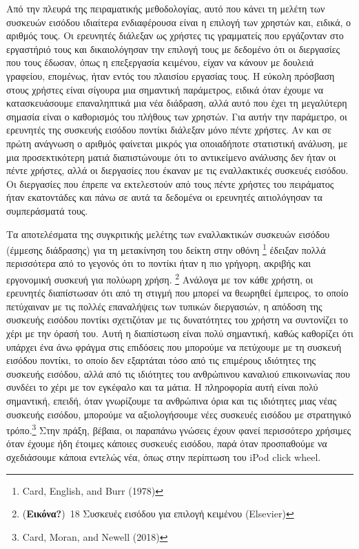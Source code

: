 \documentclass[
]{article}
\begin{document}
Από την πλευρά της πειραματικής μεθοδολογίας, αυτό που κάνει τη μελέτη
των συσκευών εισόδου ιδιαίτερα ενδιαφέρουσα είναι η επιλογή των χρηστών
και, ειδικά, ο αριθμός τους. Οι ερευνητές διάλεξαν ως χρήστες τις
γραμματείς που εργάζονταν στο εργαστήριό τους και δικαιολόγησαν την
επιλογή τους με δεδομένο ότι οι διεργασίες που τους έδωσαν, όπως η
επεξεργασία κειμένου, είχαν να κάνουν με δουλειά γραφείου, επομένως,
ήταν εντός του πλαισίου εργασίας τους. Η εύκολη πρόσβαση στους χρήστες
είναι σίγουρα μια σημαντική παράμετρος, ειδικά όταν έχουμε να
κατασκευάσουμε επαναληπτικά μια νέα διάδραση, αλλά αυτό που έχει τη
μεγαλύτερη σημασία είναι ο καθορισμός του πλήθους των χρηστών. Για αυτήν
την παράμετρο, οι ερευνητές της συσκευής εισόδου ποντίκι διάλεξαν μόνο
πέντε χρήστες. Αν και σε πρώτη ανάγνωση ο αριθμός φαίνεται μικρός για
οποιαδήποτε στατιστική ανάλυση, με μια προσεκτικότερη ματιά
διαπιστώνουμε ότι το αντικείμενο ανάλυσης δεν ήταν οι πέντε χρήστες,
αλλά οι διεργασίες που έκαναν με τις εναλλακτικές συσκευές εισόδου. Οι
διεργασίες που έπρεπε να εκτελεστούν από τους πέντε χρήστες του
πειράματος ήταν εκατοντάδες και πάνω σε αυτά τα δεδομένα οι ερευνητές
αιτιολόγησαν τα συμπεράσματά τους.

Τα αποτελέσματα της συγκριτικής μελέτης των εναλλακτικών συσκευών
εισόδου (έμμεσης διάδρασης) για τη μετακίνηση του δείκτη στην οθόνη
\footnote{Card, English, and Burr (1978)} έδειξαν πολλά περισσότερα από
το γεγονός ότι το ποντίκι ήταν η πιο γρήγορη, ακριβής και εργονομική
συσκευή για πολύωρη χρήση. \footnote{(\textbf{Εικόνα?})~18 Συσκευές
  εισόδου για επιλογή κειμένου (Elsevier)} Ανάλογα με τον κάθε χρήστη,
οι ερευνητές διαπίστωσαν ότι από τη στιγμή που μπορεί να θεωρηθεί
έμπειρος, το οποίο πετύχαιναν με τις πολλές επαναλήψεις των τυπικών
διεργασιών, η απόδοση της συσκευής εισόδου ποντίκι σχετιζόταν με τις
δυνατότητες του χρήστη να συντονίζει το χέρι με την όρασή του. Αυτή η
διαπίστωση είναι πολύ σημαντική, καθώς καθορίζει ότι υπάρχει ένα άνω
φράγμα στις επιδόσεις που μπορούμε να πετύχουμε με τη συσκευή εισόδου
ποντίκι, το οποίο δεν εξαρτάται τόσο από τις επιμέρους ιδιότητες της
συσκευής εισόδου, αλλά από τις ιδιότητες του ανθρώπινου καναλιού
επικοινωνίας που συνδέει το χέρι με τον εγκέφαλο και τα μάτια. Η
πληροφορία αυτή είναι πολύ σημαντική, επειδή, όταν γνωρίζουμε τα
ανθρώπινα όρια και τις ιδιότητες μιας νέας συσκευής εισόδου, μπορούμε να
αξιολογήσουμε νέες συσκευές εισόδου με στρατηγικό τρόπο.\footnote{Card,
  Moran, and Newell (2018)} Στην πράξη, βέβαια, οι παραπάνω γνώσεις
έχουν φανεί περισσότερο χρήσιμες όταν έχουμε ήδη έτοιμες κάποιες
συσκευές εισόδου, παρά όταν προσπαθούμε να σχεδιάσουμε κάποια εντελώς
νέα, όπως στην περίπτωση του iPod click wheel.
\end{document}
